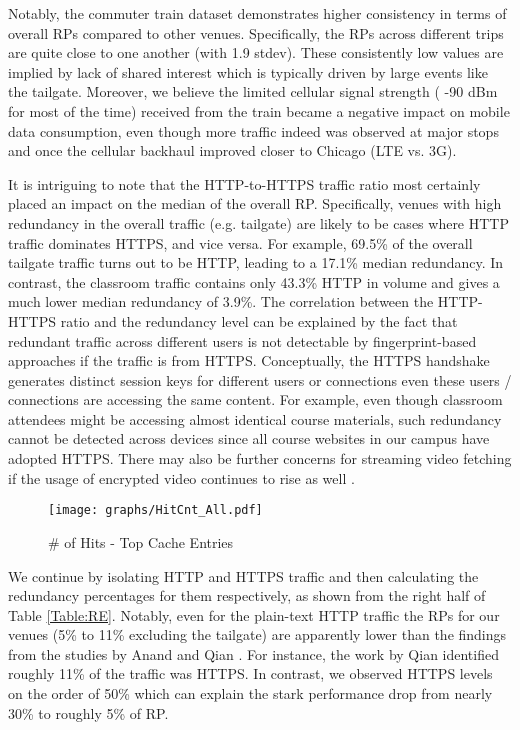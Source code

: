 \documentclass{sig-alternate}
\begin{document}
Notably, the commuter train dataset demonstrates higher consistency in terms of overall RPs compared to other venues. Specifically, the RPs across different trips are quite close to one another (with 1.9 stdev). These consistently low values are implied by lack of shared interest which is typically driven by large events like the tailgate. Moreover, we believe the limited cellular signal strength ( -90 dBm for most of the time) received from the train became a negative impact on mobile data consumption, even though more traffic indeed was observed at major stops and once the cellular backhaul improved closer to Chicago (LTE vs. 3G).
       
It is intriguing to note that the HTTP-to-HTTPS traffic ratio most certainly placed an impact on the median of the overall RP. Specifically, venues with high redundancy in the overall traffic (e.g. tailgate) are likely to be cases where HTTP traffic dominates HTTPS, and vice versa. For example, 69.5\% of the overall tailgate traffic turns out to be HTTP, leading to a 17.1\% median redundancy. In contrast, the classroom traffic contains only 43.3\% HTTP in volume and gives a much lower median redundancy of 3.9\%. The correlation between the HTTP-HTTPS ratio and the redundancy level can be explained by the fact that redundant traffic across different users is not detectable by fingerprint-based approaches if the traffic is from HTTPS. Conceptually, the HTTPS handshake generates distinct session keys for different users or connections even these users / connections are accessing the same content. For example, even though classroom attendees might be accessing almost identical course materials, such redundancy cannot be detected across devices since all course websites in our campus have adopted HTTPS. There may also be further concerns for streaming video fetching if the usage of encrypted video continues to rise as well \cite{Shafiq:2014}.  

\begin{figure}[t!]
\centering
\texttt{[image: graphs/HitCnt\_All.pdf]}
\caption{\# of Hits - Top Cache Entries}
\label{hit_cnt}
\end{figure}

We continue by isolating HTTP and HTTPS traffic and then calculating the redundancy percentages for them respectively, as shown from the right half of Table \ref{Table:RE}. Notably, even for the plain-text HTTP traffic the RPs for our venues (5\% to 11\% excluding the tailgate) are apparently lower than the findings from the studies by Anand \cite{Anand:2009} and Qian \cite{Qian:2013}. For instance, the work by Qian identified roughly 11\% of the traffic was HTTPS. In contrast, we observed HTTPS levels on the order of 50\% which can explain the stark performance drop from nearly 30\% to roughly 5\% of RP.   
\end{document}
